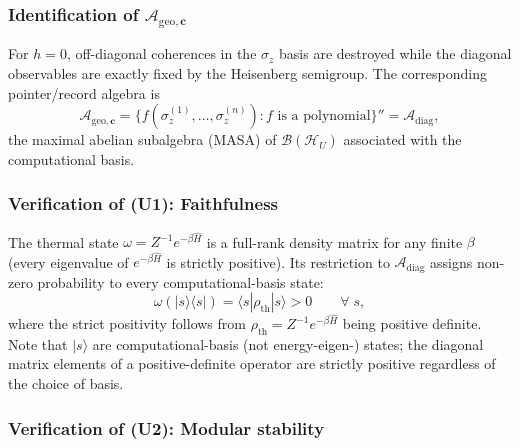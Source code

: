 \documentclass[12pt,a4paper]{article}
\begin{document}
\subsubsection{Identification of $\mathcal{A}_{\mathrm{geo},\mathbf{c}}$}

For $h=0$, off-diagonal coherences in the $\sigma_z$ basis are destroyed while the diagonal observables are exactly fixed by the Heisenberg semigroup.  The corresponding pointer/record algebra is
\begin{equation}
\mathcal{A}_{\mathrm{geo},\mathbf{c}} = \{f(\sigma_z^{(1)}, \ldots, \sigma_z^{(n)}) : f \text{ is a polynomial}\}'' = \mathcal{A}_{\mathrm{diag}},
\end{equation}
the maximal abelian subalgebra (MASA) of $\mathcal{B}(\mathcal{H}_U)$ associated with the computational basis.

\subsubsection{Verification of (U1): Faithfulness}

The thermal state $\omega = Z^{-1}e^{-\beta\hat{H}}$ is a full-rank density matrix for any finite $\beta$ (every eigenvalue of $e^{-\beta\hat{H}}$ is strictly positive).
Its restriction to $\mathcal{A}_{\mathrm{diag}}$ assigns non-zero probability to every computational-basis state:
\begin{equation}
\omega(|s\rangle\langle s|) = \langle s | \rho_{\mathrm{th}} | s \rangle > 0 \qquad \forall\; s,
\end{equation}
where the strict positivity follows from $\rho_{\mathrm{th}} = Z^{-1}e^{-\beta\hat{H}}$ being positive definite.
Note that $|s\rangle$ are computational-basis (not energy-eigen-) states; the diagonal matrix elements of a positive-definite operator are strictly positive regardless of the choice of basis.

\subsubsection{Verification of (U2): Modular stability}
\end{document}
